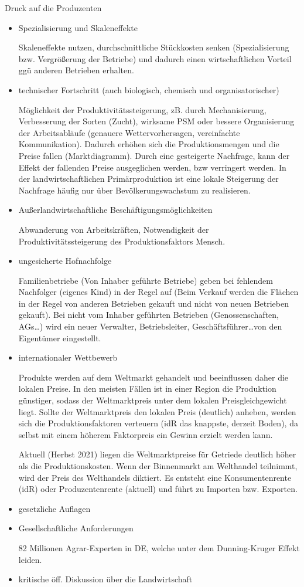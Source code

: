 \documentclass[11pt]{scrbook}
\begin{document}
Druck auf die Produzenten
\begin{itemize}
	\item{Spezialisierung und Skaleneffekte}

		Skaleneffekte nutzen, durchschnittliche Stückkosten senken (Spezialisierung bzw. Vergrößerung der Betriebe) und dadurch einen wirtschaftlichen Vorteil ggü anderen Betrieben erhalten.
	\item{technischer Fortschritt (auch biologisch, chemisch und organisatorischer)}

		Mög\-lich\-keit der Pro\-duk\-tivi\-täts\-stei\-ger\-ung, zB. durch Mechanisierung, Verbesserung der Sorten (Zucht), wirksame \ac{PSM} oder bessere Organisierung der Arbeitsabläufe (genauere Wettervorhersagen, vereinfachte Kommunikation).
		Dadurch erhöhen sich die Produktionsmengen und die Preise fallen (Marktdiagramm).
		Durch eine gesteigerte Nachfrage, kann der Effekt der fallenden Preise ausgeglichen werden, bzw verringert werden.
		In der landwirtschaftlichen Pri\-mär\-pro\-duk\-tion ist eine lokale Steigerung der Nachfrage häu\-fig nur über Be\-völ\-ker\-ungs\-wachs\-tum zu realisieren.
	\item{Außerlandwirtschaftliche Beschäftigungsmöglichkeiten}

		Abwanderung von Arbeitskräften, Notwendigkeit der Produktivitätssteigerung des Produktionsfaktors Mensch.
	\item{ungesicherte Hofnachfolge}

		Familienbetriebe (Von Inhaber geführte Betriebe) geben bei fehlendem Nachfolger (eigenes Kind) in der Regel auf (Beim Verkauf werden die Flächen in der Regel von anderen Betrieben gekauft und nicht von neuen Betrieben gekauft).
		Bei nicht vom Inhaber geführten Betrieben (Genossenschaften, AGs\ldots) wird ein neuer Verwalter, Betriebsleiter, Geschäftsführer\ldots von den Eigentümer eingestellt.
	\item{internationaler Wettbewerb}

		Produkte werden auf dem Weltmarkt gehandelt und beeinflussen daher die lokalen Preise.
		In den meisten Fäl\-len ist in einer Region die Produktion gün\-sti\-ger, sodass der Weltmarktpreis unter dem lokalen Preisgleichgewicht liegt.
		Sollte der Weltmarktpreis den lokalen Preis (deutlich) anheben, werden sich die Produktionsfaktoren verteuern (idR das knappste, derzeit Boden), da selbst mit einem höherem Faktorpreis ein Gewinn erzielt werden kann. 

		Aktuell (Herbst 2021) liegen die Weltmarktpreise für Getriede deutlich höher als die Produktionskosten.
		Wenn der Binnenmarkt am Welthandel teilnimmt, wird der Preis des Welthandels diktiert.
		Es entsteht eine Konsumentenrente (idR) oder Produzentenrente (aktuell) und führt zu Importen bzw. Exporten.

	\item{gesetzliche Auflagen}

	\item{Gesellschaftliche Anforderungen}

		82 Millionen Agrar-Experten in DE, welche unter dem Dunning-Kruger Effekt leiden.
	\item{kritische öff. Diskussion über die Landwirtschaft}
\end{itemize}
\end{document}
